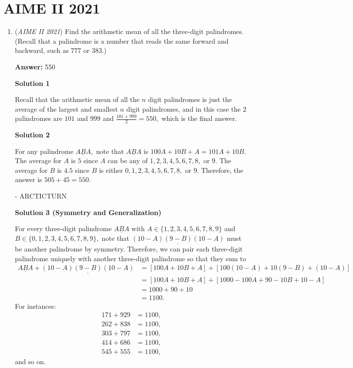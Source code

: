 \section{AIME II 2021}
        \begin{enumerate}
        	\item (\textit{AIME II 2021}) Find the arithmetic mean of all the three-digit palindromes. (Recall that a palindrome is a number that reads the same forward and backward, such as $777$ or $383$.)


 
 \textbf{Answer: }550



\textbf{Solution 1}

Recall that the arithmetic mean of all the $n$ digit palindromes is just the average of the largest and smallest $n$ digit palindromes, and in this case the $2$ palindromes are $101$ and $999$ and $\frac{101+999}{2}=\boxed{550},$ which is the final answer.

 



\textbf{Solution 2}

For any palindrome $\underline{ABA},$ note that $\underline{ABA}$ is $100A + 10B + A = 101A + 10B.$ The average for $A$ is $5$ since $A$ can be any of $1, 2, 3, 4, 5, 6, 7, 8,$ or $9.$ The average for $B$ is $4.5$ since $B$ is either $0, 1, 2, 3, 4, 5, 6, 7, 8,$ or $9.$ Therefore, the answer is $505 + 45 = \boxed{550}.$

 - ARCTICTURN

 



\textbf{Solution 3 (Symmetry and Generalization)}

For every three-digit palindrome $\underline{ABA}$ with $A\in\{1,2,3,4,5,6,7,8,9\}$ and $B\in\{0,1,2,3,4,5,6,7,8,9\},$ note that $\underline{(10-A)(9-B)(10-A)}$ must be another palindrome by symmetry. Therefore, we can pair each three-digit palindrome uniquely with another three-digit palindrome so that they sum to 
 \begin{align*} \underline{ABA}+\underline{(10-A)(9-B)(10-A)}&=\left[100A+10B+A\right]+\left[100(10-A)+10(9-B)+(10-A)\right] \\ &=\left[100A+10B+A\right]+\left[1000-100A+90-10B+10-A\right] \\ &=1000+90+10 \\ &=1100. \end{align*}
For instances:
 \begin{align*} 171+929&=1100, \\ 262+838&=1100, \\ 303+797&=1100, \\ 414+686&=1100, \\ 545+555&=1100, \end{align*}
and so on.


\end{enumerate}
